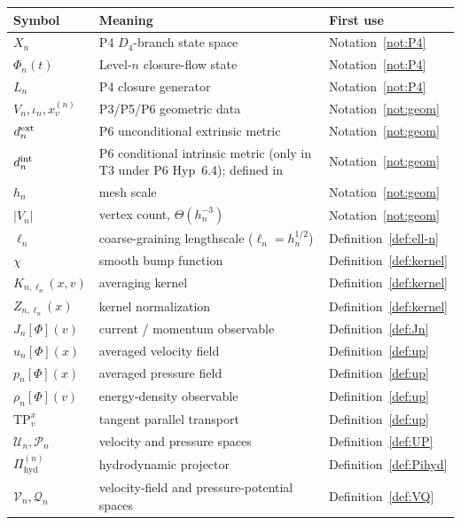 \documentclass[11pt, a4paper]{amsart}
\theoremstyle{definition}
\newcommand{\Pihyd}{\Pi_{\mathrm{hyd}}}
\begin{document}
\begin{center}
\begin{tabular}{|l|l|l|}
\hline
Symbol & Meaning & First use \\
\hline
$X_n$ & P4 $D_4$-branch state space & Notation~\ref{not:P4} \\
$\Phi_n(t)$ & Level-$n$ closure-flow state &
  Notation~\ref{not:P4} \\
$L_n$ & P4 closure generator & Notation~\ref{not:P4} \\
$V_n, \iota_n, x_v^{(n)}$ & P3/P5/P6 geometric data &
  Notation~\ref{not:geom} \\
$d_n^{\rm ext}$ & P6 unconditional extrinsic metric &
  Notation~\ref{not:geom} \\
$d_n^{\rm int}$ & P6 conditional intrinsic metric (only in T3
  under P6 Hyp~6.4); defined in
  \cite[Def.~5.1]{SchlafliConvergence} &
  Notation~\ref{not:geom} \\
$h_n$ & mesh scale & Notation~\ref{not:geom} \\
$|V_n|$ & vertex count, $\Theta(h_n^{-3})$ &
  Notation~\ref{not:geom} \\
$\ell_n$ & coarse-graining lengthscale ($\ell_n = h_n^{1/2}$) &
  Definition~\ref{def:ell-n} \\
$\chi$ & smooth bump function & Definition~\ref{def:kernel} \\
$K_{n, \ell_n}(x, v)$ & averaging kernel &
  Definition~\ref{def:kernel} \\
$Z_{n, \ell_n}(x)$ & kernel normalization &
  Definition~\ref{def:kernel} \\
$J_n[\Phi](v)$ & current / momentum observable &
  Definition~\ref{def:Jn} \\
$u_n[\Phi](x)$ & averaged velocity field &
  Definition~\ref{def:up} \\
$p_n[\Phi](x)$ & averaged pressure field &
  Definition~\ref{def:up} \\
$\rho_n[\Phi](v)$ & energy-density observable &
  Definition~\ref{def:up} \\
$\mathrm{TP}_v^x$ & tangent parallel transport &
  Definition~\ref{def:up} \\
$\mathcal U_n, \mathcal P_n$ & velocity and pressure spaces &
  Definition~\ref{def:UP} \\
$\Pihyd^{(n)}$ & hydrodynamic projector &
  Definition~\ref{def:Pihyd} \\
$\mathcal V_n, \mathcal Q_n$ & velocity-field and
  pressure-potential spaces & Definition~\ref{def:VQ} \\

\end{tabular}
\end{center}
\end{document}
